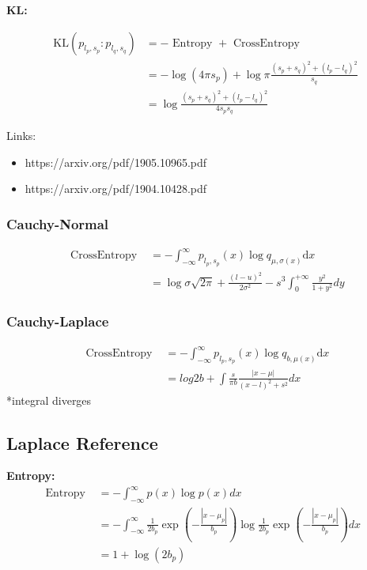 \documentclass{article}
\begin{document}
\noindent \textbf{KL:}

$$ \begin{aligned}\mathrm{KL}\left(p_{l_{p}, s_{p}}: p_{l_{q}, s_{q}}\right)&=-\text { Entropy }+\text { CrossEntropy } \\&=-\log (4 \pi s_{p})+\log \pi \frac{\left(s_{p}+s_{q}\right)^{2}+\left(l_{p}-l_{q}\right)^{2}}{s_{q}}\\&=\log\frac{\left(s_{p}+s_{q}\right)^{2}+\left(l_{p}-l_{q}\right)^{2}}{4 s_{p} s_{q}}\end{aligned} $$

Links:
\begin{itemize}
    \item https://arxiv.org/pdf/1905.10965.pdf
    \item https://arxiv.org/pdf/1904.10428.pdf
\end{itemize}

\subsubsection{Cauchy-Normal}
$$ \begin{aligned} \text { CrossEntropy }&=
-\int_{-\infty}^{\infty} p_{l_{p}, s_{p}}(x) \log q_{\mu, \sigma(x)} \mathrm{d} x \\
&=\log {\sigma\sqrt{2 \pi}}+\frac{(l-u)^{2}}{2 \sigma^{2}}  -s^{3} \int_{0}^{+\infty} \frac{y^{2}}{1+y^{2}} d y
\end{aligned} $$

\subsubsection{Cauchy-Laplace}
$$
\begin{aligned} \text { CrossEntropy }&=
-\int_{-\infty}^{\infty} p_{l_{p}, s_{p}}(x) \log q_{b, \mu(x)} \mathrm{d} x \\
&=log2b  +\int \frac{s}{\pi b} \frac{\left | x-\mu \right | }{(x-l)^{2}+s^{2}}dx 
\end{aligned}$$
*integral diverges

\subsection{Laplace Reference}

\noindent \textbf{Entropy:}
$$ \begin{aligned} \text { Entropy }&=-\int_{-\infty}^{\infty} p(x) \log p(x) d x\\&=-\int_{-\infty}^{\infty}\frac{1}{2 b_{p}} \exp \left(-\frac{\left|x-\mu_{p}\right|}{b_{p}}\right) \log \frac{1}{2 b_{p}} \exp \left(-\frac{\left|x-\mu_{p}\right|}{b_{p}}\right) d x&\\&=1+\log \left(2 b_{p}\right)
\end{aligned} $$
\end{document}
